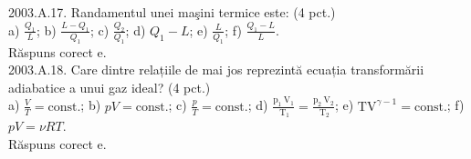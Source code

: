 2003.A.17. Randamentul unei maşini termice este: (4 pct.)\\ a) $\frac{Q_{1}}{L}$; b) $\frac{L-Q_{1}}{Q_{1}}$; c) $\frac{Q_{2}}{Q_{1}}$; d) $Q_{1}-L$; e) $\frac{L}{Q_{1}}$; f) $\frac{Q_{1}-L}{L}$.\\ Răspuns corect e.\\

2003.A.18. Care dintre relațiile de mai jos reprezintă ecuația transformării adiabatice a unui gaz ideal? (4 pct.)\\ a) $\frac{V}{T}=\text{const.}$; b) $p V=\text{const.}$; c) $\frac{p}{T}=\text{const.}$; d) $\frac{\mathrm{p}_{1} \mathrm{~V}_{1}}{\mathrm{~T}_{1}}=\frac{\mathrm{p}_{2} \mathrm{~V}_{2}}{\mathrm{~T}_{2}}$; e) $\mathrm{TV}^{\gamma-1}=\text{const.}$; f) $p V=\nu R T$.\\ Răspuns corect e.\\
